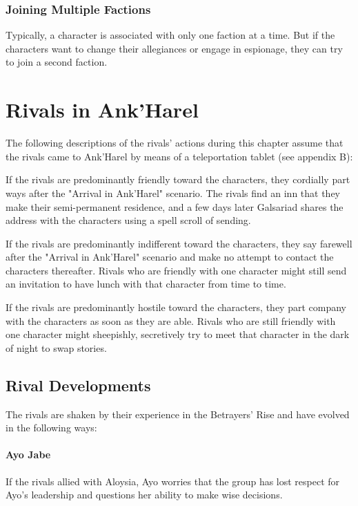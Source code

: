 \documentclass[10pt,a4paper,twoside,bg=print,twocolumn,openany,nodeprecatedcode]{dndbook}
\begin{document}
\subsubsection{Joining Multiple Factions}
Typically, a character is associated with only one faction at a time. But if the characters want to change their allegiances or engage in espionage, they can try to join a second faction.

\section{Rivals in Ank'Harel}
The following descriptions of the rivals' actions during this chapter assume that the rivals came to Ank'Harel by means of a teleportation tablet (see appendix B):


\begin{description}[nolistsep]
\item[Friendly Rivals.]
If the rivals are predominantly friendly toward the characters, they cordially part ways after the "Arrival in Ank'Harel" scenario. The rivals find an inn that they make their semi-permanent residence, and a few days later Galsariad shares the address with the characters using a spell scroll of sending.
\item[Indifferent Rivals.]
If the rivals are predominantly indifferent toward the characters, they say farewell after the "Arrival in Ank'Harel" scenario and make no attempt to contact the characters thereafter. Rivals who are friendly with one character might still send an invitation to have lunch with that character from time to time.
\item[Hostile Rivals.]
If the rivals are predominantly hostile toward the characters, they part company with the characters as soon as they are able. Rivals who are still friendly with one character might sheepishly, secretively try to meet that character in the dark of night to swap stories.
\end{description}

\subsection{Rival Developments}
The rivals are shaken by their experience in the Betrayers' Rise and have evolved in the following ways:

\paragraph{Ayo Jabe}
If the rivals allied with Aloysia, Ayo worries that the group has lost respect for Ayo's leadership and questions her ability to make wise decisions.
\end{document}
